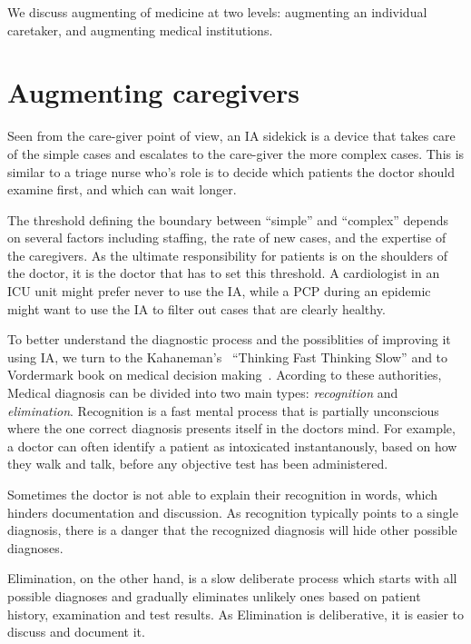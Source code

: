 \documentclass[11pt]{pnas-new}
\begin{document}
We discuss augmenting of medicine at two levels: augmenting an
individual caretaker, and augmenting medical institutions.

\section{Augmenting caregivers}



Seen from the care-giver point of view, an IA sidekick is a device
that takes care of the simple cases and escalates to the care-giver
the more complex cases. This is similar to a triage nurse who's role
is to decide which patients the doctor should examine first, and which
can wait longer.

The threshold defining the boundary between ``simple'' and ``complex''
depends on several factors including staffing, the rate of new cases, 
and the expertise of the caregivers. As the ultimate responsibility
for patients is on the shoulders of the doctor, it is the doctor that
has to set this threshold. A cardiologist in an ICU unit might prefer never
to use the IA, while a PCP during an epidemic might want to use the IA
to filter out cases that are clearly healthy.

To better understand the diagnostic process and the possiblities  of
improving it using IA, we turn to the Kahaneman's~\cite{kahneman2011thinking}
``Thinking Fast Thinking Slow'' and to Vordermark book on medical
decision making~\cite{vordermark2019introduction}. Acording to these authorities,
Medical diagnosis can be divided into two main types: {\em
  recognition} and {\em elimination}. Recognition is a fast mental
process that is partially unconscious where the one correct diagnosis
presents itself in the doctors mind. For example, a doctor can often
identify a patient as intoxicated instantanously, based on how they
walk and talk, before any objective test has been administered.

Sometimes the doctor is not able to explain their recognition in
words, which hinders documentation and discussion. As recognition
typically points to a single diagnosis, there is a danger that the
recognized diagnosis will hide other possible diagnoses.

Elimination, on the other hand, is a slow deliberate process which
starts with all possible diagnoses and gradually eliminates unlikely
ones based on patient history, examination and test results. As
Elimination is deliberative, it is easier to discuss and document it.
\end{document}
